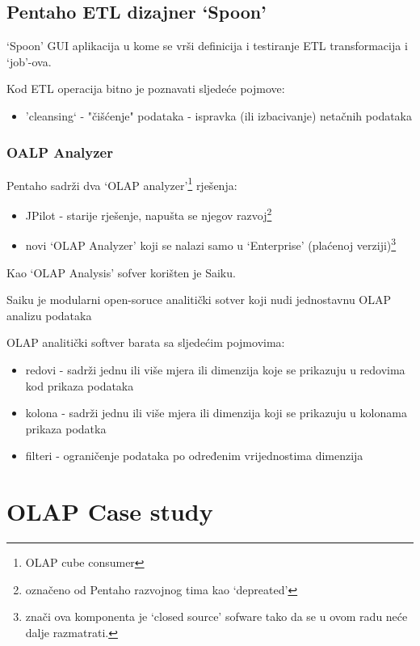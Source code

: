 \documentclass[times, utf8, seminar]{fit}
\begin{document}
\section{Pentaho ETL dizajner `Spoon'}

`Spoon' GUI aplikacija u kome se vrši definicija i testiranje ETL transformacija i `job'-ova.

Kod ETL operacija bitno je poznavati sljedeće pojmove:

\begin{itemize}
  \item 'cleansing` - "čišćenje" podataka - ispravka (ili izbacivanje) netačnih podataka
\end{itemize}

\subsection{OALP Analyzer}

Pentaho sadrži dva `OLAP analyzer'\footnote{OLAP cube consumer} rješenja:

\begin{itemize}
  \item JPilot - starije rješenje, napušta se njegov razvoj\footnote{označeno od Pentaho razvojnog tima kao `depreated'}
  \item novi `OLAP Analyzer' koji se nalazi samo u `Enterprise' (plaćenoj verziji)\footnote{znači ova komponenta je `closed source' sofware tako da se u ovom radu neće dalje razmatrati.}
\end{itemize}

Kao `OLAP Analysis' sofver korišten je Saiku.

Saiku je modularni open-soruce analitički sotver koji nudi jednostavnu OLAP analizu podataka \cite{web:saiku}

OLAP analitički softver barata sa sljedećim pojmovima:

\begin{itemize}
  \item redovi - sadrži jednu ili više mjera ili dimenzija koje se prikazuju u redovima kod prikaza podataka
  \item kolona - sadrži jednu ili više mjera ili dimenzija koji se prikazuju u kolonama prikaza podatka
  \item filteri - ograničenje podataka po određenim vrijednostima dimenzija
\end{itemize}

\chapter{OLAP Case study}
\label{chap:case_study}
\end{document}
